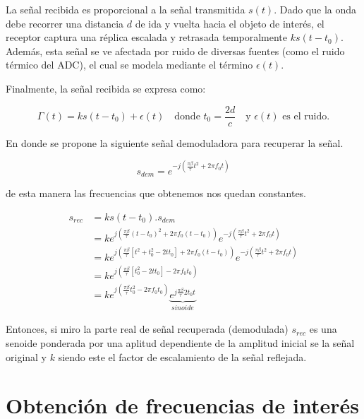 La señal recibida es proporcional a la señal transmitida $s(t)$. Dado que la onda debe recorrer una distancia $d$ de ida y vuelta hacia el objeto de interés, el receptor captura una réplica escalada y retrasada temporalmente $k s(t - t_0)$. Además, esta señal se ve afectada por ruido de diversas fuentes (como el ruido térmico del ADC), el cual se modela mediante el término $\epsilon(t)$.

Finalmente, la señal recibida se expresa como:

\begin{equation}
    \Gamma(t) = k s(t - t_0) + \epsilon(t) \quad \text{donde } t_0 = \frac{2d}{c} \quad \text{y } \epsilon(t) \text{ es el ruido.}
\end{equation}

En donde se propone la siguiente señal demoduladora para recuperar la señal.

\begin{equation}
    s_{dem} = e^{-j \left( \frac{\pi\beta}{\tau} t^{2} + 2\pi f_0 t \right)}
\end{equation}

de esta manera las frecuencias que obtenemos nos quedan constantes.

\begin{equation}
    \begin{aligned}
        s_{rec} &= ks(t-t_0).s_{dem}\\
        &= k e^{j \left( \frac{\pi\beta}{\tau} (t-t_0)^{2} + 2\pi f_0 (t-t_0) \right)} e^{-j \left( \frac{\pi\beta}{\tau} t^{2} + 2\pi f_0 t \right)}\\
        &= k e^{j \left( \frac{\pi\beta}{\tau} [t^{2}+t_0^{2} -2tt_0] + 2\pi f_0 (t-t_0) \right)} e^{-j \left( \frac{\pi\beta}{\tau} t^{2} + 2\pi f_0 t \right)}\\
         &= k e^{j \left( \frac{\pi\beta}{\tau} [t_0^{2} -2tt_0] - 2\pi f_0 t_0 \right)}\\
         &= k e^{j \left( \frac{\pi\beta}{\tau} t_0^{2} - 2\pi f_0 t_0 \right)} \underbrace{e^{j\frac{\pi \beta}{\tau}2t_0 t}}_{sinoide}
    \end{aligned}
\end{equation}

Entonces, si miro la parte real de señal recuperada (demodulada) $s_{rec}$ es una senoide ponderada por una aplitud dependiente de la amplitud inicial se la señal original y $k$ siendo este el factor de  escalamiento de la señal reflejada.

\section{Obtención de frecuencias de interés}

